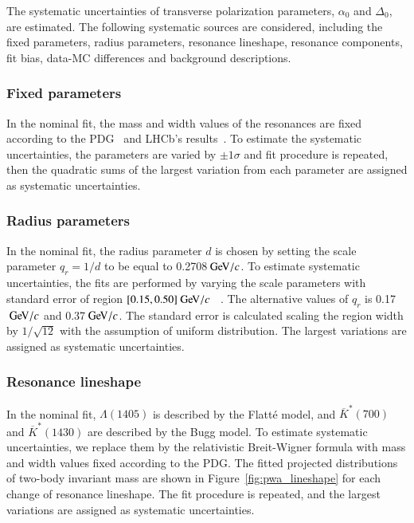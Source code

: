 The systematic uncertainties of transverse polarization parameters, $\alpha_0$ and $\Delta_0$, are estimated. The following systematic sources are considered, including the fixed parameters, radius parameters, resonance lineshape, resonance components, fit bias, data-MC differences and background descriptions.

\subsubsection{Fixed parameters}
In the nominal fit, the mass and width values of the resonances are fixed according to the PDG~\cite{Workman:2022ynf} and LHCb's results~\cite{LHCb:2022ouv}. To estimate the systematic uncertainties, the parameters are varied by $\pm 1\sigma$ and fit procedure is repeated, then the quadratic sums of the largest variation from each parameter are assigned as systematic uncertainties. 

\subsubsection{Radius parameters}
In the nominal fit, the radius parameter $d$ is chosen by setting the scale parameter $q_r = 1/d$ to be equal to 0.2708$\gev/c$. To estimate systematic uncertainties, the fits are performed by varying the scale parameters with standard error of region $[0.15, 0.50]\gev/c$ ~\cite{BESIII:2019dme}. The alternative values of $q_r$ is 0.17$\gev/c$ and 0.37$\gev/c$. The standard error is calculated scaling the region width by $1/\sqrt{12}$ with the assumption of uniform distribution. The largest variations are assigned as systematic uncertainties.

\subsubsection{Resonance lineshape}
In the nominal fit, $\Lambda(1405)$ is described by the Flatt\'e model, and $\overline{K}^*(700)$ and $\overline{K}^{*}(1430)$ are described by the Bugg model. To estimate systematic uncertainties, we replace them by the relativistic Breit-Wigner formula with mass and width values fixed according to the PDG. The fitted projected distributions of two-body invariant mass are shown in Figure~\ref{fig:pwa_lineshape} for each change of resonance lineshape. The fit procedure is repeated, and the largest variations are assigned as systematic uncertainties.

